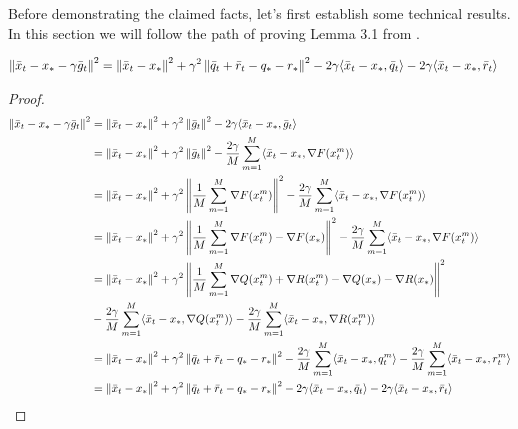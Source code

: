 
Before demonstrating the claimed facts, let's first establish some technical results.
In this section we will follow the path of proving Lemma 3.1 from \cite{Stich}.

\begin{lemma}
    \begin{align}
    \norm{\bar{x}_t - x_* - \gamma \bar{g}_t}^2
    &= \norm{\bar{x}_t - x_*}^2 
    + \gamma^2 \norm{\bar{q}_t 
    + \bar{r}_t - q_* - r_*}^2 
    - 2 \gamma \inner{\bar{x}_t - x_*}{\bar{q}_t}
    - 2 \gamma \inner{\bar{x}_t - x_*}{\bar{r}_t} \label{eq:St_0}
\end{align}
\begin{proof}
    \begin{align}
    \norm{\bar{x}_t - x_* - \gamma \bar{g}_t}^2
    &= 
    \norm{\bar{x}_t - x_*}^2 
    + \gamma^2 \norm{\bar{g}_t}^2 
    - 2 \gamma \inner{\bar{x}_t - x_*}{\bar{g}_t} \\
    &= 
    \norm{\bar{x}_t - x_*}^2 
    + \gamma^2 \norm{\bar{g}_t}^2 
    - \frac{2\gamma}{M} \summ {m=1}{M}{ \inner{\bar{x}_t - x_*}{\nabla F(x^m_t)} } \\
    &= 
    \norm{\bar{x}_t - x_*}^2 
    + \gamma^2 \norm{\fsumm {m=1}{M}{\nabla F(x^m_t)}}^2 
    - \frac{2\gamma}{M} \summ {m=1}{M}{ \inner{\bar{x}_t - x_*}{\nabla F(x^m_t)} } \\
    &= 
    \norm{\bar{x}_t - x_*}^2 
    + \gamma^2 \norm{\fsumm {m=1}{M}{\nabla F(x^m_t)} - \nabla F(x_*)}^2 
    - \frac{2\gamma}{M} \summ {m=1}{M}{ \inner{\bar{x}_t - x_*}{\nabla F(x^m_t)} } \\
    &= 
    \norm{\bar{x}_t - x_*}^2 
    + \gamma^2 \norm{\fsumm {m=1}{M}{\nabla Q(x^m_t) + \nabla R(x^m_t) - \nabla Q(x_*) - \nabla R(x_*)}}^2  \\
    &- \frac{2\gamma}{M} \summ {m=1}{M}{ \inner{\bar{x}_t - x_*}{\nabla Q(x^m_t)} }
    - \frac{2\gamma}{M} \summ {m=1}{M}{ \inner{\bar{x}_t - x_*}{\nabla R(x^m_t)} }  \\
    &= 
    \norm{\bar{x}_t - x_*}^2 
    + \gamma^2 \norm{\bar{q}_t 
    + \bar{r}_t - q_* - r_*}^2  
    - \frac{2\gamma}{M} \summ {m=1}{M}{ \inner{\bar{x}_t - x_*}{q^m_t} }
    - \frac{2\gamma}{M} \summ {m=1}{M} { \inner{\bar{x}_t - x_*}{r^m_t} } \\
    &= 
    \norm{\bar{x}_t - x_*}^2 
    + \gamma^2 \norm{\bar{q}_t 
    + \bar{r}_t - q_* - r_*}^2 
    - 2 \gamma \inner{\bar{x}_t - x_*}{\bar{q}_t}
    - 2 \gamma \inner{\bar{x}_t - x_*}{\bar{r}_t} \label{eq:St_0}
\end{align}
\end{proof}
\end{lemma}

